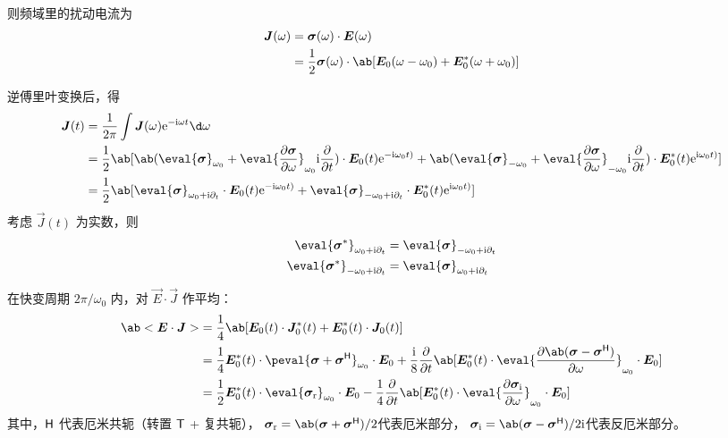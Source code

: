 则频域里的扰动电流为
\begin{equation}\begin{aligned}
\vec{J}(\omega) &= \vec{\sigma}(\omega) \cdot \vec{E}(\omega) \\
&= \frac{1}{2} \vec{\sigma}(\omega) \cdot \ab[
    \vec{E}_0(\omega - \omega_0)
  + \vec{E}_0^*(\omega + \omega_0)
]
\end{aligned}\end{equation}

逆傅里叶变换后，得
\begin{equation}\begin{aligned}
\vec{J}(t) &= \frac{1}{2\pi} \int \vec{J}(\omega) \eu^{-\im\omega t} \d\omega \\
&= \frac{1}{2} \ab[
    \ab(
        \eval{\vec{\sigma}}_{\omega_0}
        + \eval{\pdv{\vec{\sigma}}{\omega}}_{\omega_0} \im \pdv{}{t}
    ) \cdot \vec{E}_0(t) \eu^{-\im\omega_0 t)}
  + \ab(
        \eval{\vec{\sigma}}_{-\omega_0}
        + \eval{\pdv{\vec{\sigma}}{\omega}}_{-\omega_0} \im \pdv{}{t}
    ) \cdot \vec{E}_0^*(t) \eu^{\im\omega_0 t)}
] \\
&= \frac{1}{2} \ab[
    \eval{\vec{\sigma}}_{\omega_0 + \im \pdv{}!{t}}
    \cdot \vec{E}_0(t) \eu^{-\im\omega_0 t)}
  + \eval{\vec{\sigma}}_{-\omega_0 + \im \pdv{}!{t}}
    \cdot \vec{E}_0^*(t) \eu^{\im\omega_0 t)}
]
\end{aligned}\end{equation}
考虑 $\vec{J}(t)$ 为实数，则
\begin{subequations}\begin{align}
\eval{\vec{\sigma}^*}_{\omega_0 + \im \pdv{}!{t}} &
= \eval{\vec{\sigma}}_{-\omega_0 + \im \pdv{}!{t}} \\
\eval{\vec{\sigma}^*}_{-\omega_0 + \im \pdv{}!{t}} &
= \eval{\vec{\sigma}}_{\omega_0 + \im \pdv{}!{t}}
\end{align}\end{subequations}

在快变周期 $2\pi/\omega_0$ 内，对 $\vec{E}\cdot\vec{J}$ 作平均：
\begin{equation}\begin{aligned}
\ab<\vec{E}\cdot\vec{J}> &= \frac{1}{4} \ab[
    \vec{E}_0(t) \cdot \vec{J}_0^*(t)
    + \vec{E}_0^*(t) \cdot \vec{J}_0(t)
] \\
&= \frac{1}{4} \vec{E}_0^*(t) \cdot \peval{
    \vec{\sigma} + \vec{\sigma}^\HT
}_{\omega_0} \cdot \vec{E}_0
+ \frac{\im}{8} \pdv*{\ab[\vec{E}_0^*(t) \cdot \eval{
    \pdv{\ab(\vec{\sigma} - \vec{\sigma}^\HT)}{\omega}
}_{\omega_0} \cdot \vec{E}_0]}{t} \\
&= \frac{1}{2} \vec{E}_0^*(t) \cdot \eval{
    \vec{\sigma}_\re
}_{\omega_0} \cdot \vec{E}_0
- \frac{1}{4} \pdv*{\ab[\vec{E}_0^*(t) \cdot \eval{
    \pdv{\vec{\sigma}_\im}{\omega}
}_{\omega_0} \cdot \vec{E}_0]}{t}
\end{aligned}\end{equation}
其中，$\mathsf{H}$ 代表厄米共轭（转置 $\mathsf{T}$ + 复共轭），
$\vec{\sigma}_\re=\ab(\vec{\sigma}+\vec{\sigma}^\HT)/2$代表厄米部分，
$\vec{\sigma}_\im=\ab(\vec{\sigma}-\vec{\sigma}^\HT)/2\im$代表反厄米部分。

